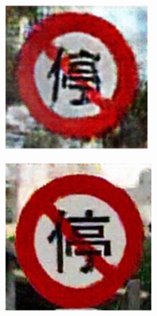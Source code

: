 \begin{figure}[H]
    \begin{subfigure}{0.125\textwidth}
        \centering
        \includegraphics[height=\textwidth]{../images/Taiwan Schilder/Generated4.png}
    \end{subfigure}
    \hspace{2em}%
    \begin{subfigure}{0.125\textwidth}
        \centering
        \includegraphics[height=\textwidth]{../images/Taiwan Schilder/Generated5.png}

\end{subfigure}
\end{figure}
